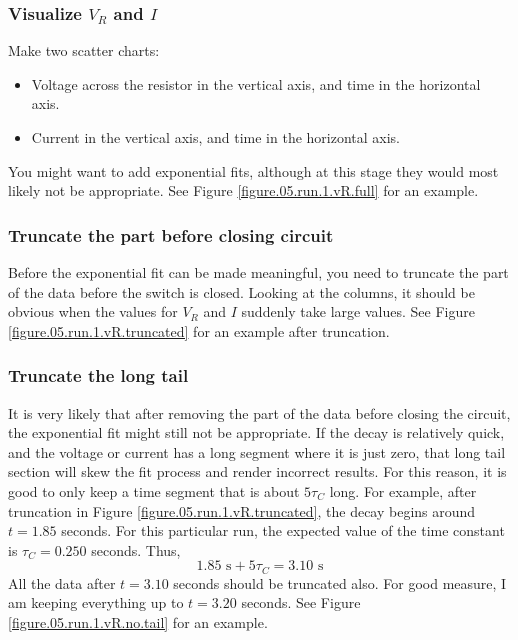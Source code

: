 \subsubsection{Visualize $V_{R}$ and $I$}
Make two scatter charts:
\begin{itemize}
    \item Voltage across the resistor in the vertical axis, and time in the horizontal axis.
    \item Current in the vertical axis, and time in the horizontal axis.
\end{itemize}
You might want to add exponential fits, although at this stage they would most likely not be appropriate. See Figure \ref{figure.05.run.1.vR.full} for an example.
\subsubsection{Truncate the part before closing circuit}
Before the exponential fit can be made meaningful, you need to truncate the part of the data before the switch is closed. Looking at the columns, it should be obvious when the values for $V_{R}$ and $I$ suddenly take large values. See Figure \ref{figure.05.run.1.vR.truncated} for an example after truncation.
\subsubsection{Truncate the long tail}
It is very likely that after removing the part of the data before closing the circuit, the exponential fit might still not be appropriate. If the decay is relatively quick, and the voltage or current has a long segment where it is just zero, that long tail section will skew the fit process and render incorrect results. For this reason, it is good to only keep a time segment that is about $5\tau_{C}$ long. For example, after truncation in Figure \ref{figure.05.run.1.vR.truncated}, the decay begins around $t = 1.85$ seconds. For this particular run, the expected value of the time constant is $\tau_{C} = 0.250$ seconds. Thus,
\begin{equation}
    1.85 \text{ s} + 5 \tau_{C} = 3.10 \text{ s}
\end{equation}
All the data after $t = 3.10$ seconds should be truncated also. For good measure, I am keeping everything up to $t = 3.20$ seconds. See Figure \ref{figure.05.run.1.vR.no.tail} for an example.
